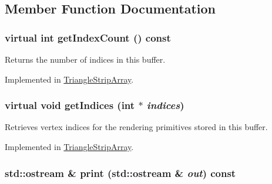 \subsection{Member Function Documentation}
\hypertarget{classm3g_1_1IndexBuffer_ac7d2c37f177b21195a81f00061ef94e}{
\subsubsection[{getIndexCount}]{\setlength{\rightskip}{0pt plus 5cm}virtual int getIndexCount () const}}
\label{classm3g_1_1IndexBuffer_ac7d2c37f177b21195a81f00061ef94e}


Returns the number of indices in this buffer. 

Implemented in \hyperlink{classm3g_1_1TriangleStripArray_fe9ae2993ebcdb93d5ff26d57c81b73e}{TriangleStripArray}.\hypertarget{classm3g_1_1IndexBuffer_59fb1eca8810ea3b028735c5dce53fca}{
\subsubsection[{getIndices}]{\setlength{\rightskip}{0pt plus 5cm}virtual void getIndices (int $\ast$ {\em indices})}}
\label{classm3g_1_1IndexBuffer_59fb1eca8810ea3b028735c5dce53fca}


Retrieves vertex indices for the rendering primitives stored in this buffer. 

Implemented in \hyperlink{classm3g_1_1TriangleStripArray_650953afac45099025a524ab160b911f}{TriangleStripArray}.\hypertarget{classm3g_1_1IndexBuffer_6fea17fa1532df3794f8cb39cb4f911f}{
\subsubsection[{print}]{\setlength{\rightskip}{0pt plus 5cm}std::ostream \& print (std::ostream \& {\em out}) const}}
\label{classm3g_1_1IndexBuffer_6fea17fa1532df3794f8cb39cb4f911f}


